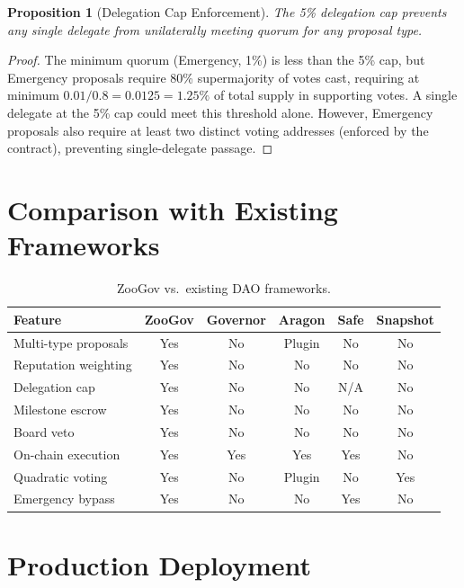 \documentclass[11pt,letterpaper]{article}
\newtheorem{proposition}[theorem]{Proposition}
\begin{document}
\begin{proposition}[Delegation Cap Enforcement]
The 5\% delegation cap prevents any single delegate from unilaterally meeting quorum for any proposal type.
\end{proposition}

\begin{proof}
The minimum quorum (Emergency, 1\%) is less than the 5\% cap, but Emergency proposals require 80\% supermajority of votes cast, requiring at minimum $0.01 / 0.8 = 0.0125 = 1.25\%$ of total supply in supporting votes. A single delegate at the 5\% cap could meet this threshold alone. However, Emergency proposals also require at least two distinct voting addresses (enforced by the contract), preventing single-delegate passage.
\end{proof}

\section{Comparison with Existing Frameworks}
\label{sec:comparison}

\begin{table}[h]
\centering
\caption{ZooGov vs.\ existing DAO frameworks.}
\label{tab:compare}
\begin{tabular}{p{3.2cm}ccccc}
\toprule
\textbf{Feature} & \textbf{ZooGov} & \textbf{Governor} & \textbf{Aragon} & \textbf{Safe} & \textbf{Snapshot} \\
\midrule
Multi-type proposals & Yes & No & Plugin & No & No \\
Reputation weighting & Yes & No & No & No & No \\
Delegation cap & Yes & No & No & N/A & No \\
Milestone escrow & Yes & No & No & No & No \\
Board veto & Yes & No & No & No & No \\
On-chain execution & Yes & Yes & Yes & Yes & No \\
Quadratic voting & Yes & No & Plugin & No & Yes \\
Emergency bypass & Yes & No & No & Yes & No \\
\bottomrule
\end{tabular}
\end{table}

\section{Production Deployment}
\label{sec:deployment}
\end{document}
